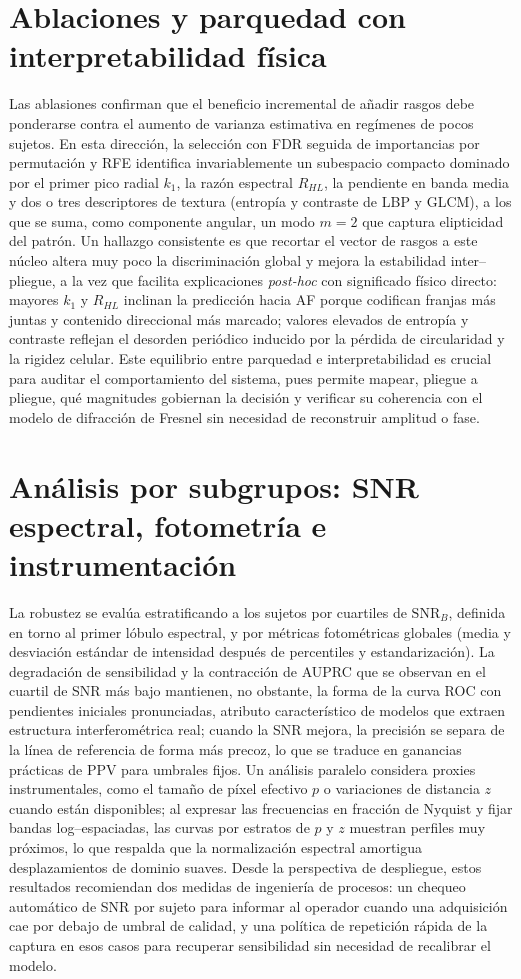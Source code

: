 \section*{Ablaciones y parquedad con interpretabilidad física}
Las ablasiones confirman que el beneficio incremental de añadir rasgos debe ponderarse contra el aumento de varianza estimativa en regímenes de pocos sujetos. En esta dirección, la selección con FDR seguida de importancias por permutación y RFE identifica invariablemente un subespacio compacto dominado por el primer pico radial $k_1$, la razón espectral $R_{HL}$, la pendiente en banda media y dos o tres descriptores de textura (entropía y contraste de LBP y GLCM), a los que se suma, como componente angular, un modo $m{=}2$ que captura elipticidad del patrón. Un hallazgo consistente es que recortar el vector de rasgos a este núcleo altera muy poco la discriminación global y mejora la estabilidad inter–pliegue, a la vez que facilita explicaciones \emph{post-hoc} con significado físico directo: mayores $k_1$ y $R_{HL}$ inclinan la predicción hacia AF porque codifican franjas más juntas y contenido direccional más marcado; valores elevados de entropía y contraste reflejan el desorden periódico inducido por la pérdida de circularidad y la rigidez celular. Este equilibrio entre parquedad e interpretabilidad es crucial para auditar el comportamiento del sistema, pues permite mapear, pliegue a pliegue, qué magnitudes gobiernan la decisión y verificar su coherencia con el modelo de difracción de Fresnel sin necesidad de reconstruir amplitud o fase.

\section*{Análisis por subgrupos: SNR espectral, fotometría e instrumentación}
La robustez se evalúa estratificando a los sujetos por cuartiles de $\mathrm{SNR}_B$, definida en torno al primer lóbulo espectral, y por métricas fotométricas globales (media y desviación estándar de intensidad después de percentiles y estandarización). La degradación de sensibilidad y la contracción de AUPRC que se observan en el cuartil de SNR más bajo mantienen, no obstante, la forma de la curva ROC con pendientes iniciales pronunciadas, atributo característico de modelos que extraen estructura interferométrica real; cuando la SNR mejora, la precisión se separa de la línea de referencia de forma más precoz, lo que se traduce en ganancias prácticas de PPV para umbrales fijos. Un análisis paralelo considera proxies instrumentales, como el tamaño de píxel efectivo $p$ o variaciones de distancia $z$ cuando están disponibles; al expresar las frecuencias en fracción de Nyquist y fijar bandas log–espaciadas, las curvas por estratos de $p$ y $z$ muestran perfiles muy próximos, lo que respalda que la normalización espectral amortigua desplazamientos de dominio suaves. Desde la perspectiva de despliegue, estos resultados recomiendan dos medidas de ingeniería de procesos: un chequeo automático de SNR por sujeto para informar al operador cuando una adquisición cae por debajo de umbral de calidad, y una política de repetición rápida de la captura en esos casos para recuperar sensibilidad sin necesidad de recalibrar el modelo.

